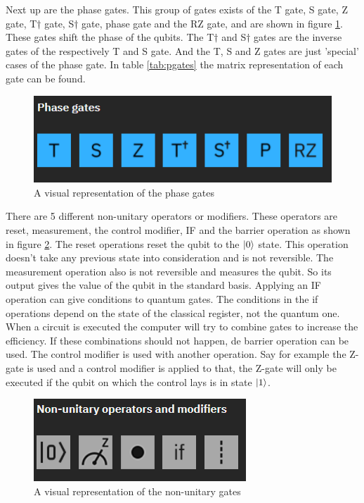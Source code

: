 Next up are the phase gates. This group of gates exists of the T gate, S gate, Z gate, T$\dagger$ gate, S$\dagger$ gate, phase gate and the RZ gate, and are shown in figure \ref{fig:phase gates}. These gates shift the phase of the qubits.
The T$\dagger$ and S$\dagger$ gates are the inverse gates of the respectively T and S gate. And the T, S and Z gates are just 'special' cases of the phase gate.
In table \ref{tab:pgates} the matrix representation of each gate can be found.

\begin{figure} [h]
    \centering
    \includegraphics[width=\textwidth]{img/phase-gates.PNG}
        \caption{A visual representation of the phase gates}
        \label{fig:phase gates}
\end{figure}

There are 5 different non-unitary operators or modifiers. These operators are reset, measurement, the control modifier, IF and the barrier operation as shown in figure \ref{fig:non-uni gates}.
The reset operations reset the qubit to the $\ket{0}$ state. This operation doesn't take any previous state into consideration and is not reversible.
The measurement operation also is not reversible and measures the qubit. So its output gives the value of the qubit in the standard basis.
Applying an IF operation can give conditions to quantum gates. The conditions in the if operations depend on the state of the classical register, not the quantum one.
When a circuit is executed the computer will try to combine gates to increase the efficiency. If these combinations should not happen, de barrier operation can be used.
The control modifier is used with another operation. Say for example the Z-gate is used and a control modifier is applied to that, the Z-gate will only be executed if the qubit on which the control lays is in state $\ket{1}$.

\begin{figure} [h]
    \centering
    \includegraphics[width=\textwidth]{img/non-unitary-gates.PNG}
        \caption{A visual representation of the non-unitary gates}
        \label{fig:non-uni gates}
\end{figure}

